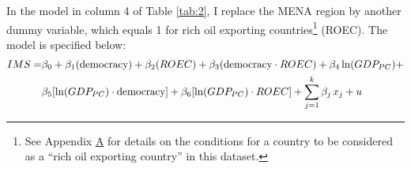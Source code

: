 \documentclass[../main.tex]{subfiles}
\begin{document}
In the model in column 4 of Table \ref{tab:2}, I replace the MENA region by another dummy variable, which equals 1 for rich oil exporting countries\footnote{See Appendix \hyperref[sec:A]{A} for details on the conditions for a country to be considered as a ``rich oil exporting country'' in this dataset.} (ROEC). The model is specified below:
\begin{equation}
\begin{split}
IMS=&\beta_0+\beta_1 (\text{democracy}) + \beta_2 (ROEC)+ \beta_{3} (\text{democracy} \cdot ROEC)+\beta_4 \ln (GDP_{PC}) + \\ 
     &\beta_5 [ \ln (GDP_{PC}) \cdot \text{democracy}]+\beta_6 [ \ln (GDP_{PC}) \cdot ROEC]+\sum_{j=1}^k \beta_j\hspace{0.05cm} x_j+u 
     \end{split}
    \label{eqn:6}
\end{equation}
\end{document}
